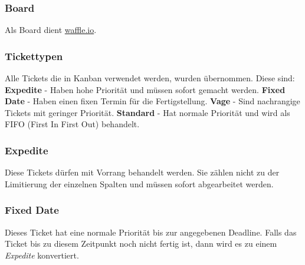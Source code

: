 \documentclass[a4paper]{book}
\begin{document}
\subsubsection{Board}
Als Board dient \href{https://waffle.io/chronos38/libipc-}{waffle.io}.

\subsubsection{Tickettypen}
Alle Tickets die in Kanban verwendet werden, wurden übernommen. Diese sind:\newline
\textbf{Expedite} - Haben hohe Priorität und müssen sofort gemacht werden.\newline
\textbf{Fixed Date} - Haben einen fixen Termin für die Fertigstellung.\newline
\textbf{Vage} - Sind nachrangige Tickets mit geringer Priorität.\newline
\textbf{Standard} - Hat normale Priorität und wird als FIFO (First In First Out) behandelt.

\subsubsection{Expedite}
Diese Tickets dürfen mit Vorrang behandelt werden. Sie zählen nicht zu der Limitierung der einzelnen Spalten und müssen sofort abgearbeitet werden.

\subsubsection{Fixed Date}
Dieses Ticket hat eine normale Priorität bis zur angegebenen Deadline. Falls das Ticket bis zu diesem Zeitpunkt noch nicht fertig ist, dann wird es zu einem \textit{Expedite} konvertiert.
\end{document}
